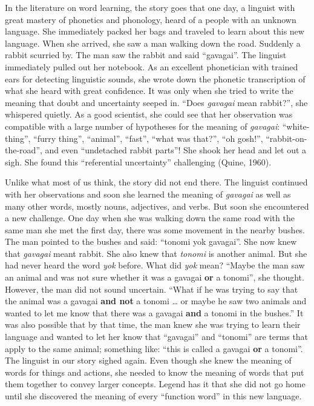\documentclass[oneside]{report}
\theoremstyle{definition}
\theoremstyle{definition}
\theoremstyle{definition}
\theoremstyle{remark}
\begin{document}
In the literature on word learning, the story goes that one day, a
linguist with great mastery of phonetics and phonology, heard of a
people with an unknown language. She immediately packed her bags and
traveled to learn about this new language. When she arrived, she saw a
man walking down the road. Suddenly a rabbit scurried by. The man saw
the rabbit and said ``gavagai''. The linguist immediately pulled out her
notebook. As an excellent phonetician with trained ears for detecting
linguistic sounds, she wrote down the phonetic transcription of what she
heard with great confidence. It was only when she tried to write the
meaning that doubt and uncertainty seeped in. ``Does \emph{gavagai} mean
rabbit?'', she whispered quietly. As a good scientist, she could see
that her observation was compatible with a large number of hypotheses
for the meaning of \emph{gavagai}: ``white-thing'', ``furry thing'',
``animal'', ``fast'', ``what was that?'', ``oh gosh!'',
``rabbit-on-the-road'', and even ``undetached rabbit parts''! She shook
her head and let out a sigh. She found this ``referential uncertainty''
challenging (Quine, 1960).

Unlike what most of us think, the story did not end there. The linguist
continued with her observations and soon she learned the meaning of
\emph{gavagai} as well as many other words, mostly nouns, adjectives,
and verbs. But soon she encountered a new challenge. One day when she
was walking down the same road with the same man she met the first day,
there was some movement in the nearby bushes. The man pointed to the
bushes and said: ``tonomi yok gavagai''. She now knew that
\emph{gavagai} meant rabbit. She also knew that \emph{tonomi} is another
animal. But she had never heard the word \emph{yok} before. What did
\emph{yok} mean? ``Maybe the man saw an animal and was not sure whether
it was a gavagai \textbf{or} a tonomi'', she thought. However, the man
did not sound uncertain. ``What if he was trying to say that the animal
was a gavagai \textbf{and not} a tonomi \ldots{} or maybe he saw two
animals and wanted to let me know that there was a gavagai \textbf{and}
a tonomi in the bushes.'' It was also possible that by that time, the
man knew she was trying to learn their language and wanted to let her
know that ``gavagai'' and ``tonomi'' are terms that apply to the same
animal; something like: ``this is called a gavagai \textbf{or} a
tonomi''. The linguist in our story sighed again. Even though she knew
the meaning of words for things and actions, she needed to know the
meaning of words that put them together to convey larger concepts.
Legend has it that she did not go home until she discovered the meaning
of every ``function word'' in this new language.
\end{document}

